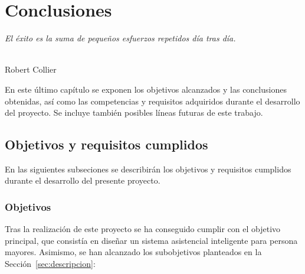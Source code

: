\chapter{Conclusiones}
\label{cap:capitulo5}

\begin{flushright}
\begin{minipage}[]{10cm}
\emph{El éxito es la suma de pequeños esfuerzos repetidos día tras día.}\\
\end{minipage}\\

Robert Collier\\
\end{flushright}

\vspace{1cm}


En este último capítulo se exponen los objetivos alcanzados y las conclusiones obtenidas, así como las competencias y requisitos adquiridos durante el desarrollo del proyecto.
Se incluye también posibles líneas futuras de este trabajo.

\section{Objetivos y requisitos cumplidos}

En las siguientes subseciones se describirán los objetivos y requisitos cumplidos durante el desarrollo del presente proyecto.

\subsection{Objetivos}


Tras la realización de este proyecto se ha conseguido cumplir con el objetivo principal, que consistía en diseñar un sistema asistencial inteligente para persona mayores. Asimismo, se han alcanzado los subobjetivos planteados en la Sección~\ref{sec:descripcion}:

